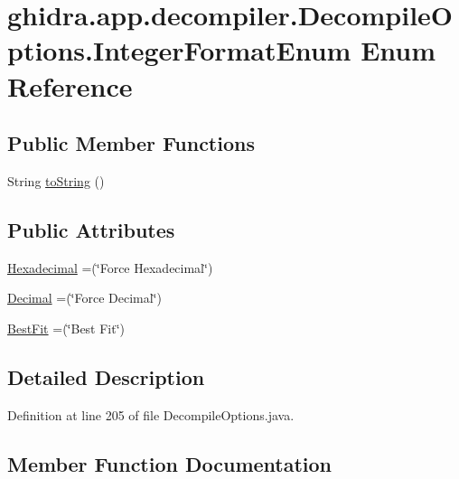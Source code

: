 \hypertarget{enumghidra_1_1app_1_1decompiler_1_1_decompile_options_1_1_integer_format_enum}{}\section{ghidra.\+app.\+decompiler.\+Decompile\+Options.\+Integer\+Format\+Enum Enum Reference}
\label{enumghidra_1_1app_1_1decompiler_1_1_decompile_options_1_1_integer_format_enum}
\subsection*{Public Member Functions}
\begin{DoxyCompactItemize}
\item 
String \mbox{\hyperlink{enumghidra_1_1app_1_1decompiler_1_1_decompile_options_1_1_integer_format_enum_a632e20f550d204662eaa12e66d3e428e}{to\+String}} ()
\end{DoxyCompactItemize}
\subsection*{Public Attributes}
\begin{DoxyCompactItemize}
\item 
\mbox{\hyperlink{enumghidra_1_1app_1_1decompiler_1_1_decompile_options_1_1_integer_format_enum_ad17d2bed58a349ff04a127f3bfb78f33}{Hexadecimal}} =(\char`\"{}Force Hexadecimal\char`\"{})
\item 
\mbox{\hyperlink{enumghidra_1_1app_1_1decompiler_1_1_decompile_options_1_1_integer_format_enum_af47d39fa6c9a019096b0c8062ffd1000}{Decimal}} =(\char`\"{}Force Decimal\char`\"{})
\item 
\mbox{\hyperlink{enumghidra_1_1app_1_1decompiler_1_1_decompile_options_1_1_integer_format_enum_a168907d7b15674e0cfb6465e11abcb3d}{Best\+Fit}} =(\char`\"{}Best Fit\char`\"{})
\end{DoxyCompactItemize}


\subsection{Detailed Description}


Definition at line 205 of file Decompile\+Options.\+java.



\subsection{Member Function Documentation}
\mbox{\label{enumghidra_1_1app_1_1decompiler_1_1_decompile_options_1_1_integer_format_enum_a632e20f550d204662eaa12e66d3e428e}} 
